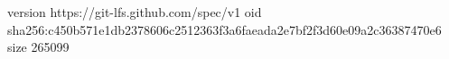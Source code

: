version https://git-lfs.github.com/spec/v1
oid sha256:c450b571e1db2378606c2512363f3a6faeada2e7bf2f3d60e09a2c36387470e6
size 265099
